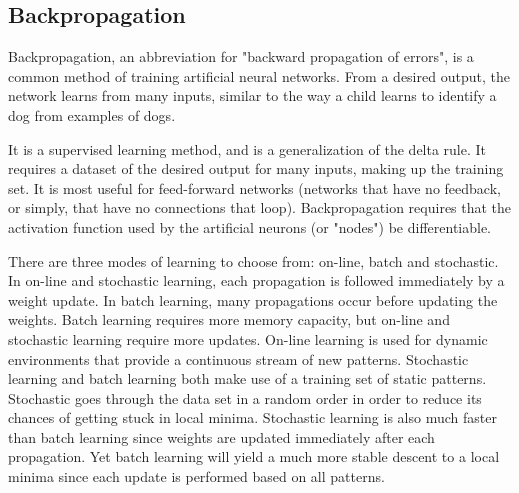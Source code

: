\documentclass[a4paper,12pt]{article}
\begin{document}
\subsection{Backpropagation}

Backpropagation, an abbreviation for "backward propagation of errors", is a common method of training artificial neural networks. From a desired output, the network learns from many inputs, similar to the way a child learns to identify a dog from examples of dogs.

It is a supervised learning method, and is a generalization of the delta rule. It requires a dataset of the desired output for many inputs, making up the training set. It is most useful for feed-forward networks (networks that have no feedback, or simply, that have no connections that loop). Backpropagation requires that the activation function used by the artificial neurons (or "nodes") be differentiable.

There are three modes of learning to choose from: on-line, batch and stochastic. In on-line and stochastic learning, each propagation is followed immediately by a weight update. In batch learning, many propagations occur before updating the weights. Batch learning requires more memory capacity, but on-line and stochastic learning require more updates. On-line learning is used for dynamic environments that provide a continuous stream of new patterns. Stochastic learning and batch learning both make use of a training set of static patterns. Stochastic goes through the data set in a random order in order to reduce its chances of getting stuck in local minima. Stochastic learning is also much faster than batch learning since weights are updated immediately after each propagation. Yet batch learning will yield a much more stable descent to a local minima since each update is performed based on all patterns.
\end{document}
